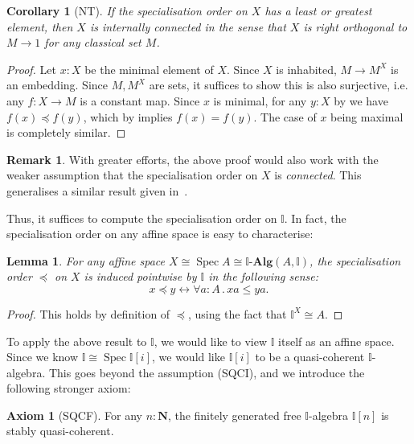 \documentclass[12pt]{amsart}
\newtheorem{lemma}[theorem]{Lemma}
\newtheorem{corollary}[theorem]{Corollary}
\theoremstyle{definition}
\newtheorem{remark}[theorem]{Remark}
\newtheorem*{axiom}{Axiom}
\newcommand{\mb}[1]{\mathbf{#1}}
\newcommand{\mbb}[1]{\mathbb{#1}}
\newcommand{\I}{\mbb I}
\newcommand{\alg}{\text{-}\mb{Alg}}
\newcommand{\N}{\mb N}
\newcommand{\fa}[2]{\forall #1\!\colon\!\!#2\mathpunct{.}}
\newcommand{\eq}{\leftrightarrow}
\newcommand{\spec}{\operatorname{Spec}}
\begin{document}
\begin{corollary}[NT]\label{cor:connectedpreservediscrete}
  If the specialisation order on $X$ has a least or greatest element, then $X$ is \emph{internally connected} in the sense that $X$ is right orthogonal to $M \to 1$ for any classical set $M$.
\end{corollary}
\begin{proof}
  Let $x:X$ be the minimal element of $X$. Since $X$ is inhabited, $M \to M^X$ is an embedding. Since $M,M^X$ are sets, it suffices to show this is also surjective, i.e. any $f \colon X \to M$ is a constant map. Since $x$ is minimal, for any $y:X$ by  we have $f(x) \preceq f(y)$, which by  implies $f(x) = f(y)$. The case of $x$ being maximal is completely similar.
\end{proof}

\begin{remark}
  With greater efforts, the above proof would also work with the weaker assumption that the specialisation order on $X$ is \emph{connected}. This generalises a similar result given in~\cite[Prop.~4.4.1]{hyland1990first}.
\end{remark}

Thus, it suffices to compute the specialisation order on $\I$. In fact, the specialisation order on any affine space is easy to characterise:

\begin{lemma}\label{lem:specorderofaffine}
  For any affine space $X \cong \spec A \cong \I\alg(A,\I)$, the specialisation order $\preceq$ on $X$ is induced pointwise by $\I$ in the following sense:
  \[ x \preceq y \eq \fa aA xa \le ya. \]
\end{lemma}
\begin{proof}
  This holds by definition of $\preceq$, using the fact that $\I^X \cong A$.
\end{proof}

To apply the above result to $\I$, we would like to view $\I$ itself as an affine space. Since we know $\I \cong \spec\I[i]$, we would like $\I[i]$ to be a quasi-coherent $\I$-algebra. This goes beyond the assumption (SQCI), and we introduce the following stronger axiom:

\begin{axiom}[SQCF]
  For any $n : \N$, the finitely generated free $\I$-algebra $\I[n]$ is stably quasi-coherent. 
\end{axiom}
\end{document}
